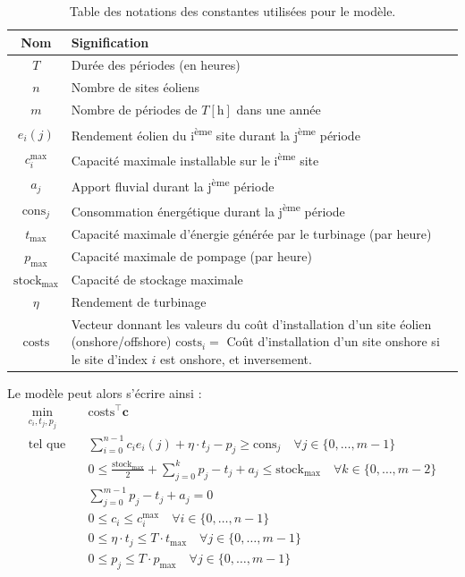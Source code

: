 \documentclass{article}
\newcommand{\unit}[1]{[\mathrm{#1}]}
\begin{document}
\begin{table}[H]
    \centering
    \renewcommand{\arraystretch}{1.5}%
    \begin{tabular}{|c || p{14cm} |} 
        \hline
        Nom & Signification\\
        \hline\hline
        $T$ & Durée des périodes (en heures) \\
        $n$ & Nombre de sites éoliens \\
        $m$ & Nombre de périodes de $T \unit{h}$ dans une année\\
        $e_i(j)$ & Rendement éolien du i\textsuperscript{ème} site durant la j\textsuperscript{ème} période\\
        $c_i^\mathrm{max}$ & Capacité maximale installable sur le i\textsuperscript{ème} site \\
        $a_j$ & Apport fluvial durant la j\textsuperscript{ème} période\\
        $\mathrm{cons}_j$ & Consommation énergétique durant la j\textsuperscript{ème} période\\
        $t_\mathrm{max}$ & Capacité maximale d'énergie générée par le turbinage (par heure)\\
        $p_\mathrm{max}$ & Capacité maximale de pompage (par heure)\\
        $\mathrm{stock}_\mathrm{max}$ & Capacité de stockage maximale\\
        $\eta$ & Rendement de turbinage\\
        $\mathrm{costs}$ & Vecteur donnant les valeurs du coût d'installation d'un site éolien  (onshore/offshore) \newline $\mathrm{costs}_i = $ Coût d'installation d'un site onshore si le site d'index $i$ est onshore, et inversement.\\  
        \hline
    \end{tabular}
    \caption{Table des notations des constantes utilisées pour le modèle.}
    \label{table:notations_constantes}
\end{table}
Le modèle peut alors s'écrire ainsi :
\begin{align}
    \min_{c_{i},t_j,p_j} \quad &\mathrm{costs}^\intercal\mathbf{c} \nonumber\\
    \textrm{tel que} \quad & \sum_{i=0}^{n-1} c_i e_i(j) + \eta \cdot t_j - p_j \ge \mathrm{cons}_j \quad \forall j \in  \{ 0, \ldots, m-1 \}\label{eq:4A_contr1}\\
    & 0 \le \frac{\mathrm{stock}_\mathrm{max}}{2}  + \sum_{j=0}^{k} p_j - t_j + a_j \le  \mathrm{stock}_\mathrm{max} \quad \forall k \in \{ 0, \ldots, m-2 \}\label{eq:4A_contr2}\\
    & \sum_{j=0}^{m-1} p_j - t_j + a_j = 0 \label{eq:4A_contr3}\\
    & 0 \le c_i \le c_i^\mathrm{max} \quad \forall i \in  \{ 0, \ldots, n-1 \}  \label{eq:4A_contr4}\\
    & 0 \le \eta \cdot t_j \le  T \cdot t_\mathrm{max} \quad \forall j \in  \{ 0, \ldots, m-1 \}  \label{eq:4A_contr5}\\
    & 0 \le p_j \le  T \cdot p_\mathrm{max} \quad \forall j \in  \{ 0, \ldots, m-1 \} \label{eq:4A_contr6}
\end{align}
\end{document}
